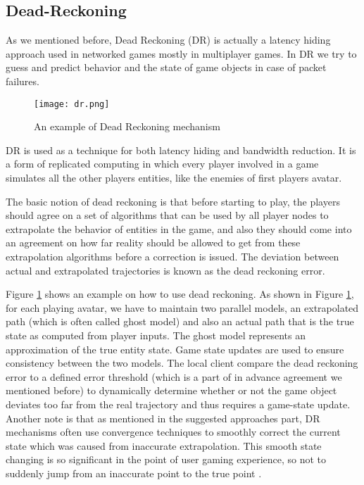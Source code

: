\documentclass[conference]{IEEEtran}
\begin{document}
\subsection{Dead-Reckoning}
As we mentioned before, Dead Reckoning (DR) is actually a latency hiding approach used in networked games mostly in multiplayer games. In DR we try to guess and predict behavior and the state of game objects in case of packet failures.

\begin{figure}[!t]
\caption{An example of Dead Reckoning mechanism}
\centering
\texttt{[image: dr.png]}
\label{dr}
\end{figure}

DR is used as a technique for both latency hiding and bandwidth reduction. It is a form of replicated computing in which every player involved in a game simulates all the other players entities, like the enemies of first players avatar.

The basic notion of dead reckoning is that before starting to play, the players should agree on a set of algorithms that can be used by all player nodes to extrapolate the behavior of entities in the game, and also they should come into an agreement on how far reality should be allowed to get from these extrapolation algorithms before a correction is issued. The deviation between actual and extrapolated trajectories is known as the dead reckoning error.

Figure \ref{dr} shows an example on how to use dead reckoning. As shown in Figure \ref{dr}, for each playing avatar, we have to maintain two parallel models, an extrapolated path (which is often called ghost model) and also an actual path that is the true state as computed from player inputs. The ghost model represents an approximation of the true entity state. Game state updates are used to ensure consistency between the two models. The local client compare the dead reckoning error to a defined error threshold (which is a part of in advance agreement we mentioned before) to dynamically determine whether or not the game object deviates too far from the real trajectory and thus requires a game-state update. Another note is that as mentioned in the suggested approaches part, DR mechanisms often use convergence techniques to smoothly correct the current state which was caused from inaccurate extrapolation. This smooth state changing is so significant in the point of user gaming experience, so not to suddenly jump from an inaccurate point to the true point \cite{r30}.
\end{document}
